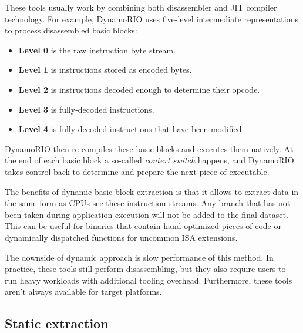 These tools usually work by combining both disassembler and JIT compiler technology. For example, 
DynamoRIO uses five-level intermediate representations to process disassembled basic blocks:
\begin{itemize}
	\item \textbf{Level 0} is the raw instruction byte stream.
	\item \textbf{Level 1} is instructions stored as encoded bytes.
	\item \textbf{Level 2} is instructions decoded enough to determine their opcode.
	\item \textbf{Level 3} is fully-decoded instructions.
	\item \textbf{Level 4} is fully-decoded instructions that have been modified.
\end{itemize}
DynamoRIO then re-compiles these basic blocks and executes them natively. At the end of each basic 
block a so-called \textit{context switch} happens, and DynamoRIO takes control back to determine and 
prepare the next piece of executable.

The benefits of dynamic basic block extraction is that it allows to extract data in the same form as 
CPUs see these instruction streams. Any branch that has not been taken during application execution 
will not be added to the final dataset. This can be useful for binaries that contain hand-optimized 
pieces of code or dynamically dispatched functions for uncommon ISA extensions.

The downside of dynamic approach is slow performance of this method. In practice, these tools still 
perform disassembling, but they also require users to run heavy workloads with additional tooling 
overhead. Furthermore, these tools aren't always available for target platforms.

\subsection{Static extraction}

